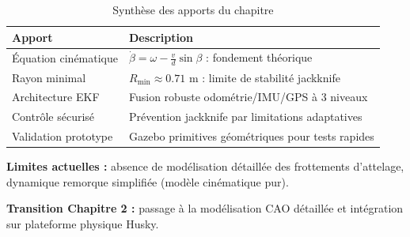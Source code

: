 \documentclass[a4paper,12pt]{report}
\begin{document}
\begin{table}[htbp]
    \centering
    \begin{tabular}{lp{10cm}}
        \toprule
        \textbf{Apport} & \textbf{Description} \\
        \midrule
        Équation cinématique & $\dot{\beta} = \omega - \frac{v}{d}\sin\beta$ : fondement théorique \\
        Rayon minimal & $R_{\min} \approx 0.71$ m : limite de stabilité jackknife \\
        Architecture EKF & Fusion robuste odométrie/IMU/GPS à 3 niveaux \\
        Contrôle sécurisé & Prévention jackknife par limitations adaptatives \\
        Validation prototype & Gazebo primitives géométriques pour tests rapides \\
        \bottomrule
    \end{tabular}
    \caption{Synthèse des apports du chapitre}
    \label{tab:synthese_chapitre}
\end{table}

\textbf{Limites actuelles :} absence de modélisation détaillée des frottements d'attelage, dynamique remorque simplifiée (modèle cinématique pur).

\textbf{Transition Chapitre 2 :} passage à la modélisation CAO détaillée et intégration sur plateforme physique Husky.
\end{document}
